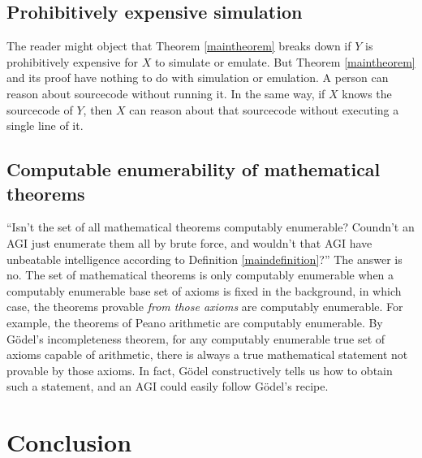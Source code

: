 \documentclass[runningheads]{llncs}
\begin{document}
\subsection{Prohibitively expensive simulation}

The reader might object that Theorem \ref{maintheorem} breaks down if $Y$ is prohibitively
expensive for $X$ to simulate or emulate. But Theorem \ref{maintheorem} and its
proof have nothing to do with simulation or emulation. A person can reason about sourcecode
without running it. In the same way, if $X$ knows the sourcecode
of $Y$, then $X$ can reason about that sourcecode without executing a single line
of it.

\subsection{Computable enumerability of mathematical theorems}

``Isn't the set of all mathematical theorems computably enumerable?
Coundn't an AGI just enumerate them all by brute force, and wouldn't that AGI have
unbeatable intelligence according to Definition \ref{maindefinition}?'' The answer is no.
The set of mathematical theorems is only computably enumerable when a computably
enumerable base set of axioms is fixed in the background, in which case,
the theorems provable \emph{from those axioms} are computably enumerable.
For example, the
theorems of Peano arithmetic are computably enumerable.
By G\"odel's incompleteness theorem, for any computably
enumerable true set of axioms capable of arithmetic, there is always a
true mathematical statement not provable by
those axioms. In fact, G\"odel constructively tells us how to obtain such a
statement, and an AGI could easily follow G\"odel's recipe.

\section{Conclusion}
\label{conclusionsection}
\end{document}
